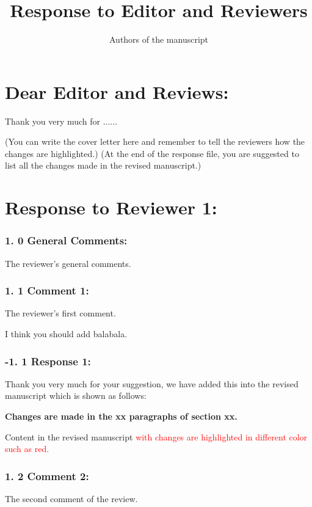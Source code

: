 \documentclass{article}
\title{\LARGE \bf Response to Editor and Reviewers}
\date{}
\author{Authors of the manuscript}
\begin{document}
\maketitle


\section*{Dear Editor and Reviews:}

Thank you very much for ......

(You can write the cover letter here and remember to tell the reviewers how the changes are highlighted.)
(At the end of the response file, you are suggested to list all the changes made in the revised manuscript.)

\section*{Response to Reviewer 1:}
\subsubsection*{1. 0   General Comments:}
The reviewer's general comments.

\subsubsection*{1. 1   Comment 1:}

The reviewer's first comment.  

I think you should add balabala.

\subsubsection*{-1. 1   Response 1:}
Thank you very much for your suggestion, we have added this into the revised manuscript which is shown as follows:


\textbf{Changes are made in the xx paragraphs of section xx.}

Content in the revised manuscript  \textcolor{red}{with changes are highlighted in different color such as red.}



\subsubsection*{1. 2   Comment 2:}
The second comment of the review.
\end{document}
